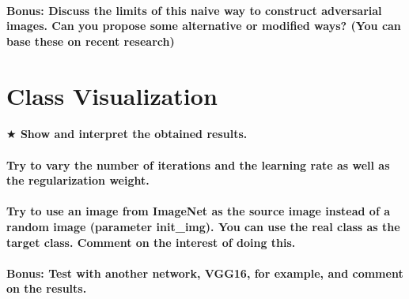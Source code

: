 \paragraph*{\textbf{Bonus:} Discuss the limits of this naive way to construct adversarial images. Can you propose some alternative or modiﬁed ways? (You can base these on recent research)}


\section{Class Visualization}
\paragraph*{$ \bigstar $ Show and interpret the obtained results.}

\paragraph*{Try to vary the number of iterations and the learning rate as well as the regularization weight.}

\paragraph*{Try to use an image from ImageNet as the source image instead of a random image (parameter init\_img). You can use the real class as the target class. Comment on the interest of doing this.}

\paragraph*{\textbf{Bonus:} Test with another network, VGG16, for example, and comment on the results.}

